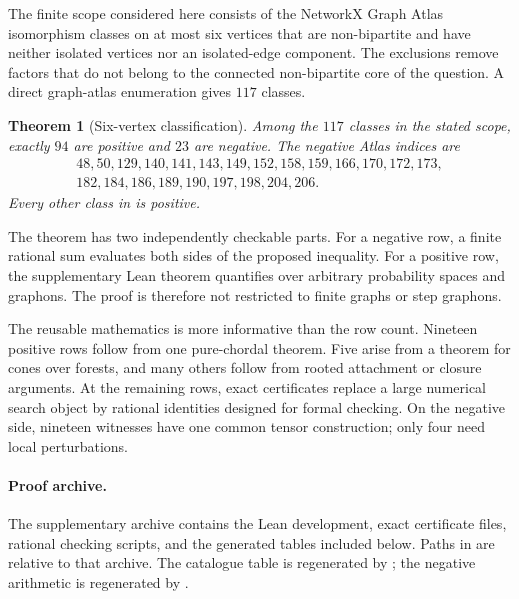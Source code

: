\documentclass[11pt]{article}
\numberwithin{equation}{section}
\newtheorem{theorem}{Theorem}[section]
\theoremstyle{definition}
\theoremstyle{remark}
\begin{document}
The finite scope considered here consists of the NetworkX Graph Atlas
isomorphism classes on at most six vertices that are non-bipartite and have
neither isolated vertices nor an isolated-edge component.  The exclusions
remove factors that do not belong to the connected non-bipartite core of the
question.  A direct graph-atlas enumeration gives $117$ classes.

\begin{theorem}[Six-vertex classification]
\label{thm:classification}
Among the $117$ classes in the stated scope, exactly $94$ are positive and
$23$ are negative.  The negative Atlas indices are
\begin{equation}
\begin{split}
 48,50,129,140,141,143,149,152,158,159,166,170,172,173,{}\\
 182,184,186,189,190,197,198,204,206.
\end{split}
\label{eq:negative-list}
\end{equation}
Every other class in  is positive.
\end{theorem}

The theorem has two independently checkable parts.  For a negative row, a
finite rational sum evaluates both sides of the proposed inequality.  For a
positive row, the supplementary Lean theorem quantifies over arbitrary
probability spaces and graphons.  The proof is therefore not restricted to
finite graphs or step graphons.

The reusable mathematics is more informative than the row count.  Nineteen
positive rows follow from one pure-chordal theorem.  Five arise from a theorem
for cones over forests, and many others follow from rooted attachment or
closure arguments.  At the remaining rows, exact certificates replace a
large numerical search object by rational identities designed for formal
checking.  On the negative side, nineteen witnesses have one common tensor
construction; only four need local perturbations.

\paragraph{Proof archive.}
The supplementary archive contains the Lean development, exact certificate
files, rational checking scripts, and the generated tables included below.
Paths in  are relative to that archive.  The catalogue
table is regenerated by
; the negative
arithmetic is regenerated by
.
\end{document}
